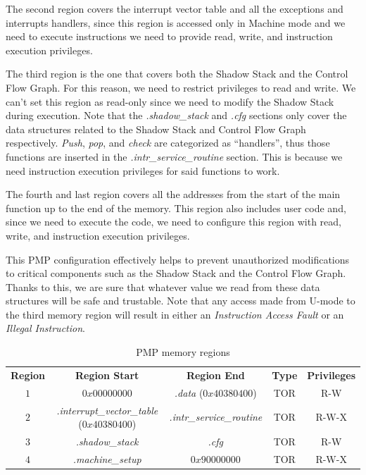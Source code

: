 The second region covers the interrupt vector table and all the exceptions and interrupts
handlers, since this region is accessed only in Machine mode and we need to
execute instructions we need to provide read, write, and instruction execution
privileges.

The third region is the one that covers both the Shadow Stack and the Control
Flow Graph. For this reason, we need to restrict privileges to read and write. We
can't set this region as read-only since we need to modify the Shadow Stack during
execution. Note that the \textit{.shadow\_stack} and \textit{.cfg} sections only
cover the data structures related to the Shadow Stack and Control Flow Graph
respectively. \textit{Push}, \textit{pop}, and \textit{check} are categorized as
``handlers'', thus those functions are inserted in the \textit{.intr\_service\_routine}
section. This is because we need instruction execution privileges for said functions
to work.

The fourth and last region covers all the addresses from the start of the main function
up to the end of the memory. This region also includes user code and, since we need
to execute the code, we need to configure this region with read, write, and
instruction execution privileges.

This PMP configuration effectively helps to prevent unauthorized modifications
to critical components such as the Shadow Stack and the Control Flow Graph. Thanks
to this, we are sure that whatever value we read from these data structures will
be safe and trustable. Note that any access made from U-mode to the third memory
region will result in either an \textit{Instruction Access Fault} or an \textit{Illegal
Instruction}.

\begin{table}
  \centering
  \begin{tabular}{|c|c|c|c|c|}
    \hline
    \textbf{Region}    & \textbf{Region Start}                             & \textbf{Region End}              & \textbf{Type} & \textbf{Privileges} \\
    \hhline{=====} $1$ & $0x00000000$                                      & \textit{.data} ($0x40380400$)    & TOR           & R-W                 \\
    \hline
    $2$                & \textit{.interrupt\_vector\_table} ($0x40380400$) & \textit{.intr\_service\_routine} & TOR           & R-W-X               \\
    \hline
    $3$                & \textit{.shadow\_stack}                           & \textit{.cfg}                    & TOR           & R-W                 \\
    \hline
    $4$                & \textit{.machine\_setup}                          & $0x90000000$                     & TOR           & R-W-X               \\
    \hline
  \end{tabular}
  \caption{PMP memory regions}
  \label{tab:pmpregions}
\end{table}

